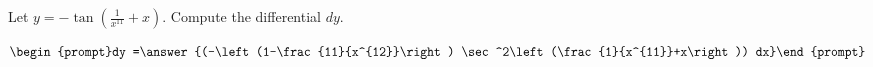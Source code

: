 \documentclass{ximera}
\author{Bart Snapp}
\begin{document}
\begin{exercise}

Let $y= -\tan \left(\frac{1}{x^{11}}+x\right)$. Compute the differential $dy$.

\[
\begin{prompt}dy =\answer{(-\left(1-\frac{11}{x^{12}}\right) \sec ^2\left(\frac{1}{x^{11}}+x\right)) dx}\end{prompt}
\]
\end{exercise}
\end{document}
